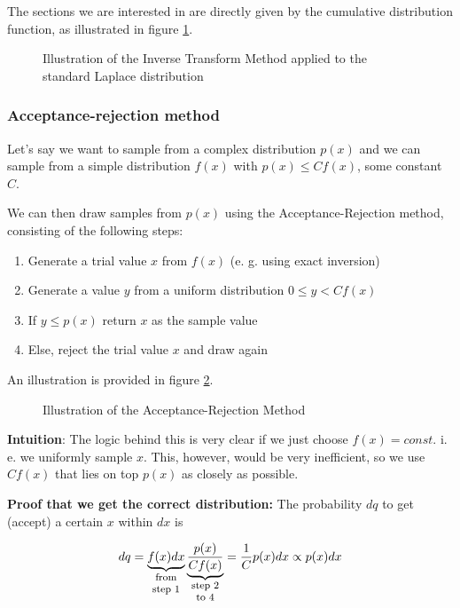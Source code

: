 The sections we are interested in are directly given by the cumulative distribution function, as illustrated in
figure \ref{fig:discrete_transform}.

\begin{figure}[!htb]
 \centering
 \hfill
 \caption{Illustration of the Inverse Transform Method applied to the standard Laplace distribution}
 \label{fig:discrete_transform}
\end{figure}

\subsubsection{Acceptance-rejection method}
Let's say we want to sample from a complex distribution $p(x)$ and we can sample from a simple distribution $f(x)$ with
$p(x) \leq C f(x)$, some constant $C$.

We can then draw samples from $p(x)$ using the Acceptance-Rejection method, consisting of the following steps:
\begin{enumerate}
    \item Generate a trial value $x$ from $f(x)$ (e. g. using exact inversion)
    \item Generate a value $y$ from a uniform distribution $0\leq y<C f(x)$
    \item If $y\leq p(x)$ return $x$ as the sample value
    \item Else, reject the trial value $x$ and draw again
\end{enumerate}

An illustration is provided in figure \ref{fig:acceptance_rejection}.

\begin{figure}[!htb]
 \centering
 \hfill
 \caption{Illustration of the Acceptance-Rejection Method}
 \label{fig:acceptance_rejection}
\end{figure}
 
\textbf{Intuition}: The logic behind this is very clear if we just choose $f(x)=const$. i. e. we uniformly sample $x$. This, however, would be very inefficient, so we use $ C f(x)$ that lies on top $p(x)$ as closely as possible.
\par
\textbf{Proof that we get the correct distribution:} The probability $dq$ to get (accept) a certain $x$ within $dx$ is

\begin{equation}
    dq = \explain{f(x) dx}{from step 1} \explain{\frac{p(x)}{C f(x)}}{step 2 to 4} = \frac{1}{C} p(x) dx \propto p(x) dx
\end{equation}

